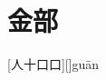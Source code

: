 \chapter{金部}

\begin{Lemma} %
	[人十口口][]{gu\=an}{}
	\pro{}\lipsum
	\begin{mainenum}
		\mitem  \en{}
		\E{\e \e \e }
		\mitem  \en{}
		\E{\e \e \e }
		\mitem  \en{}
		\E{\e \e \e }
	\end{mainenum}
\end{Lemma}







